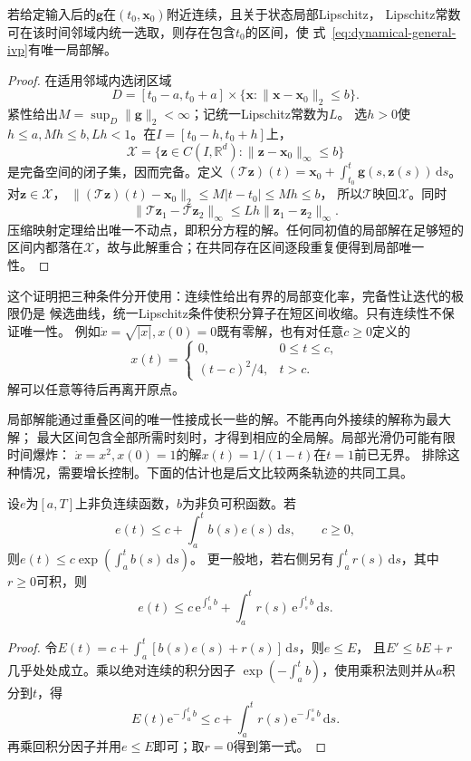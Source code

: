 \begin{theorem}[局部存在唯一性]
  \label{thm:dynamical-picard-lindelof}
  若给定输入后的$\bm g$在$(t_0,\bm x_0)$附近连续，且关于状态局部Lipschitz，
  Lipschitz常数可在该时间邻域内统一选取，则存在包含$t_0$的区间，使
  式~\eqref{eq:dynamical-general-ivp}有唯一局部解。
\end{theorem}
\begin{proof}
  在适用邻域内选闭区域
  \[
    D=[t_0-a,t_0+a]\times
    \{\bm x:\|\bm x-\bm x_0\|_2\leq b\}.
  \]
  紧性给出$M=\sup_D\|\bm g\|_2<\infty$；记统一Lipschitz常数为$L$。
  选$h>0$使$h\leq a,Mh\leq b,Lh<1$。在$I=[t_0-h,t_0+h]$上，
  \[
    \mathcal X=\{\bm z\in C(I,\mathbb R^d):
       \|\bm z-\bm x_0\|_\infty\leq b\}
  \]
  是完备空间的闭子集，因而完备。定义
  $(\mathcal T\bm z)(t)=\bm x_0+\int_{t_0}^t\bm g(s,\bm z(s))\,\mathrm ds$。
  对$\bm z\in\mathcal X$，
  $\|(\mathcal T\bm z)(t)-\bm x_0\|_2\leq M|t-t_0|\leq Mh\leq b$，
  所以$\mathcal T$映回$\mathcal X$。同时
  \[
    \|\mathcal T\bm z_1-\mathcal T\bm z_2\|_\infty
    \leq Lh\|\bm z_1-\bm z_2\|_\infty.
  \]
  压缩映射定理给出唯一不动点，即积分方程的解。任何同初值的局部解在足够短的
  区间内都落在$\mathcal X$，故与此解重合；在共同存在区间逐段重复便得到局部唯一性。
\end{proof}

这个证明把三种条件分开使用：连续性给出有界的局部变化率，完备性让迭代的极限仍是
候选曲线，统一Lipschitz条件使积分算子在短区间收缩。只有连续性不保证唯一性。
例如$\dot x=\sqrt{|x|},x(0)=0$既有零解，也有对任意$c\geq0$定义的
\[
  x(t)=
  \begin{cases}
    0,&0\leq t\leq c,\\
    (t-c)^2/4,&t>c.
  \end{cases}
\]
解可以任意等待后再离开原点。

局部解能通过重叠区间的唯一性接成长一些的解。不能再向外接续的解称为最大解；
最大区间包含全部所需时刻时，才得到相应的全局解。局部光滑仍可能有限时间爆炸：
$\dot x=x^2,x(0)=1$的解$x(t)=1/(1-t)$在$t=1$前已无界。
排除这种情况，需要增长控制。下面的估计也是后文比较两条轨迹的共同工具。

\begin{lemma}[Grönwall积分估计]
  \label{lem:action-state-gronwall}
  设$e$为$[a,T]$上非负连续函数，$b$为非负可积函数。若
  \[
    e(t)\leq c+\int_a^t b(s)e(s)\,\mathrm ds,\qquad c\geq0,
  \]
  则$e(t)\leq c\exp(\int_a^t b(s)\,\mathrm ds)$。
  更一般地，若右侧另有$\int_a^t r(s)\,\mathrm ds$，其中$r\geq0$可积，则
  \[
    e(t)\leq c\,\mathrm e^{\int_a^t b}
      +\int_a^t r(s)\,\mathrm e^{\int_s^t b}\,\mathrm ds.
  \]
\end{lemma}
\begin{proof}
  令$E(t)=c+\int_a^t[b(s)e(s)+r(s)]\,\mathrm ds$，则$e\leq E$，
  且$E'\leq bE+r$几乎处处成立。乘以绝对连续的积分因子
  $\exp(-\int_a^t b)$，使用乘积法则并从$a$积分到$t$，得
  \[
    E(t)\mathrm e^{-\int_a^t b}
    \leq c+\int_a^t r(s)\mathrm e^{-\int_a^s b}\,\mathrm ds.
  \]
  再乘回积分因子并用$e\leq E$即可；取$r=0$得到第一式。
\end{proof}

